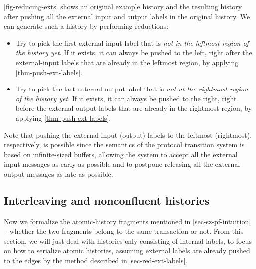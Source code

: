 \autoref{fig-reducing-exts} shows an original example history and the resulting history after pushing all the external input and output labels in the original history.
We can generate such a history by performing reductions:
\begin{itemize}
\item Try to pick the first external-input label that is \emph{not in the leftmost region of the history yet}. If it exists, it can always be pushed to the left, right after the external-input labels that are already in the leftmost region, by applying \autoref{thm-push-ext-labels}.
\item Try to pick the last external output label that is \emph{not at the rightmost region of the history yet}. If it exists, it can always be pushed to the right, right before the external-output labels that are already in the rightmost region, by applying \autoref{thm-push-ext-labels}.
\end{itemize}
Note that pushing the external input (output) labels to the leftmost (rightmost), respectively, is possible since the semantics of the protocol transition system is based on infinite-sized buffers, allowing the system to accept all the external input messages as early as possible and to postpone releasing all the external output messages as late as possible.

\subsection{Interleaving and nonconfluent histories}
\label{sec-itlv-ncf-hst}

Now we formalize the atomic-history fragments mentioned in \autoref{sec-sz-pf-intuition} -- whether the two fragments belong to the same transaction or not.
From this section, we will just deal with histories only consisting of internal labels, to focus on how to serialize atomic histories, assuming external labels are already pushed to the edges by the method described in \autoref{sec-red-ext-labels}.

